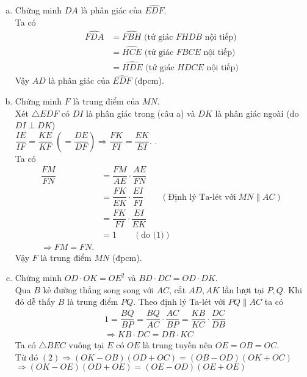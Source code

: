 \begin{ex}
{\begin{enumerate}[1.]
		\begin{enumerate}[a)]%
			\item Chứng minh $DA$ là phân giác của $\widehat{EDF}$.\\
		Ta có
			\begin{align*}
			 \widehat{FDA} &=\widehat{FBH}  \text{ (tứ giác $FHDB$ nội tiếp)} \\
			&= \widehat{HCE} \text{ (tứ giác $FBCE$ nội tiếp)} \\
			&=\widehat{HDE} \text{ (tứ giác $HDCE$ nội tiếp)}
			\end{align*} 
			Vậy $AD$ là phân giác của $\widehat{EDF}$ (đpcm).
			\item Chứng minh $F$ là trung điểm của $MN$.\\
			Xét $\triangle EDF$ có $DI$ là phân giác trong (câu a) và $DK$ là phân giác ngoài (do $DI \perp DK$) \\
			$\dfrac{IE}{IF} = \dfrac{KE}{KF}\; \left ( = \dfrac{DE}{DF} \right ) \Rightarrow \dfrac{FK}{FI} = \dfrac{EK}{EI}.$ .\\
			Ta có 
			\begin{align*}
			\dfrac{FM}{FN} &= \dfrac{FM}{AE} \cdot \dfrac{AE}{FN} \\
		&	= \dfrac{FK}{EK} \cdot \dfrac{EI}{FI} \qquad (\text{Định lý Ta-lét với} \; MN \parallel AC) \\
			&= \dfrac{FK}{FI} \cdot \dfrac{EI}{EK}\\
			& = 1 \qquad (\text{do (1)}) \\
			\Rightarrow FM = FN.
			\end{align*}
			Vậy $F$ là trung điểm $MN$ (đpcm).
			\item Chứng minh $OD\cdot OK = OE^2$ và $BD\cdot DC = OD \cdot DK$.\\     
			Qua $B$ kẻ đường thẳng song song với $AC$, cắt $AD,AK$ lần lượt tại $P,Q$. Khi đó dễ thấy $B$ là trung điểm $PQ$. Theo định lý Ta-lét với $PQ \parallel AC$ ta có
			\begin{align*}
			&1=\dfrac{BQ}{BP}=\dfrac{BQ}{AC} \cdot \dfrac{AC}{BP} = \dfrac{KB}{KC} \cdot \dfrac{DC}{DB} \\
			&\Rightarrow KB \cdot DC = DB \cdot KC \tag{2}
			\end{align*}
			Ta có $\triangle BEC$ vuông tại $E$ có $OE$ là trung tuyến nên $OE=OB=OC$. \\
			Từ đó $(2)  \Rightarrow (OK - OB) (OD + OC) = (OB-OD)(OK + OC)$ \\
			$\Rightarrow (OK - OE) (OD + OE) = (OE-OD)(OE + OE)$ \\

\end{enumerate}
\end{enumerate}}
\end{ex}
